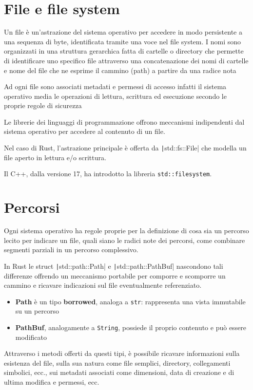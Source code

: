 \section{File e file system}
Un file è un'astrazione del sistema operativo per accedere in modo persistente a
una sequenza di byte, identificata tramite una voce nel file system. I nomi sono
organizzati in una struttura gerarchica fatta di cartelle o directory che
permette di identificare uno specifico file attraverso una concatenazione dei
nomi di cartelle e nome del file che ne esprime il cammino (path) a partire da
una radice nota

Ad ogni file sono associati metadati e permessi di accesso infatti il sistema
operativo media le operazioni di lettura, scrittura ed esecuzione secondo le
proprie regole di sicurezza

Le librerie dei linguaggi di programmazione offrono meccanismi indipendenti dal
sistema operativo per accedere al contenuto di un file.

Nel caso di Rust, l'astrazione principale è offerta da \texttt|std::fs::File| che
modella un file aperto in lettura e/o scrittura.

Il C++, dalla versione 17, ha introdotto la libreria \texttt{std::filesystem}.

\section{Percorsi}

Ogni sistema operativo ha regole proprie per la definizione di cosa sia un
percorso lecito per indicare un file, quali siano le radici note dei percorsi,
come combinare segmenti parziali in un percorso complessivo.

In Rust le struct \texttt|std::path::Path| e  \texttt|std::path::PathBuf| nascondono
tali differenze offrendo un meccanismo portabile per comporre e scomporre un cammino
e ricavare indicazioni sul file eventualmente referenziato.


\begin{itemize}
  \item \textbf{Path} è un tipo \textbf{borrowed}, analoga a \verb|str|: rappresenta una vista immutabile su un percorso
  \item \textbf{PathBuf}, analogamente a \texttt{String}, possiede il proprio contenuto e può
        essere modificato
\end{itemize}

Attraverso i metodi offerti da questi tipi, è possibile ricavare informazioni sulla
esistenza del file, sulla sua natura come file semplici, directory, collegamenti simbolici, ecc.,
sui metadati associati come dimensioni, data di creazione e di ultima modifica e permessi, ecc.


